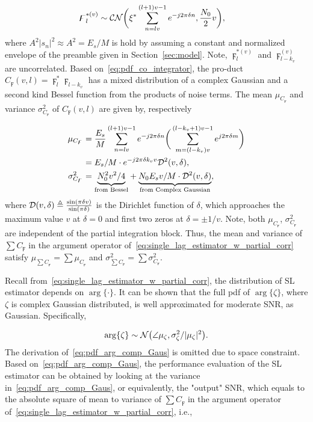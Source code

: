 \begin{equation}
  \label{eq:pdf_co_integrator}
  \begin{aligned}
    &\digamma_l^{*(v)} \sim \mathcal{CN}\bigg(\xi^*\sum_{n=lv}^{(l+1)v-1}e^{-j2\pi \delta n},\frac{N_0}{2}v\bigg),
  \end{aligned}
\end{equation}
where $A^2|s_n|^2 \approx A^2= E_s/M$ is hold by assuming a constant and normalized envelope of the preamble given in Section~\ref{sec:model}.
Note, $\digamma_l^{*(v)}$ and $\digamma_{l-k_v}^{(v)}$ are uncorrelated. 
Based on~\eqref{eq:pdf_co_integrator}, 
the pro-duct $C_{\digamma}(v,l)=\digamma_l^*\digamma_{l-k_v}$
has a mixed distribution of a complex Gaussian and a second kind Bessel function
from the products of noise terms. 
The mean $\mu_{C_{\digamma}}$ and variance $\sigma^2_{C_{\digamma}}$ of $C_{\digamma}(v,l)$ are given by, respectively 

\begin{equation}
  \begin{aligned}
  \label{eq:mean_var_product_coherent_int}
  \mu_{C_{\digamma}}&=\frac{E_s}{M}\sum_{n=lv}^{(l+1)v-1}e^{-j2\pi \delta n}\bigg(\sum_{m=(l-k_v)v}^{(l-k_v+1)v-1}e^{j2\pi \delta m}\bigg) \\
  &=E_s/M\cdot e^{-j2\pi \delta k_vv}\mathcal{D}^2(v,\delta), \\
  \sigma^2_{C_{\digamma}}&={\underbrace{N_0^2v^2/4}_{\text{from Bessel}}}+{\underbrace{N_0E_sv/M\cdot\mathcal{D}^2(v,\delta)}_{\text{from Complex Gaussian}}},
  \end{aligned}
\end{equation}
where $\mathcal{D}(v,\delta) \triangleq \frac{\sin(\pi \delta v)}{\sin(\pi \delta)}$ is the Dirichlet function of $\delta$, which approaches
the maximum value $v$ at $\delta=0$ and first two zeros at $\delta=\pm 1/v$.
Note, both $\mu_{C_{\digamma}}$, $\sigma^2_{C_{\digamma}}$ are independent of the partial integration block.
Thus, the mean and variance of  
$\sum C_{\digamma}$ in the argument operator of~\eqref{eq:single_lag_estimator_w_partial_corr} 
satisfy $\mu_{\sum C_{\digamma}}=\sum\mu_{C_{\digamma}}$ and 
$\sigma^2_{\sum C_{\digamma}}=\sum\sigma^2_{C_{\digamma}}$.

Recall from~\eqref{eq:single_lag_estimator_w_partial_corr}, the distribution of SL estimator depends on $\arg\{\cdot\}$.
It can be shown that the full pdf of $\arg\{\zeta\}$, where $\zeta$ is complex Gaussian distributed, is well approximated for moderate SNR, as Gaussian.
Specifically,

\begin{equation}
  \label{eq:pdf_arg_comp_Gaus}
  \arg\{\zeta\} \sim \mathcal{N}\big(\angle \mu_{\zeta},\sigma^2_{\zeta}/|\mu_{\zeta}|^2\big).
\end{equation}
The derivation of~\eqref{eq:pdf_arg_comp_Gaus} is omitted due to space constraint.
Based on~\eqref{eq:pdf_arg_comp_Gaus}, the performance evaluation of 
the SL estimator can be obtained by looking at the variance in~\eqref{eq:pdf_arg_comp_Gaus},
or equivalently, the "output" SNR, which equals to the absolute square of mean to variance of
$\sum C_{\digamma}$ in the argument operator of~\eqref{eq:single_lag_estimator_w_partial_corr}, i.e.,

